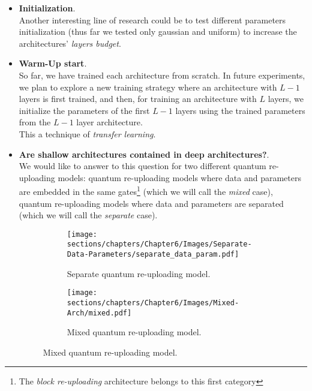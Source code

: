 \begin{itemize}
    \item \textbf{Initialization}.\\
    Another interesting line of research could be to test different parameters initialization (thus far
    we tested only gaussian and uniform) to increase the architectures' \textit{layers budget}.
    
    \item \textbf{Warm-Up start}.\\
    So far, we have trained each architecture from scratch. In future experiments, we plan to explore 
    a new training strategy where an architecture with $L-1$ layers is first trained, and then, 
    for training an architecture with $L$ layers, we initialize the parameters of the first $L-1$ 
    layers using the trained parameters from the $L-1$ layer architecture.\\
    This a technique of \textit{transfer learning}.


    \item \textbf{Are shallow architectures contained in deep architectures?}.\\
    We would like to answer to this question for two different quantum re-uploading models:
    quantum re-uploading models where data and parameters are embedded in the same gates\footnote[1]{The 
    \textit{block re-uploading} architecture belongs to this first category} (which we will call the \textit{mixed}
    case), quantum re-uploading models where data and parameters are separated (which we will call the 
    \textit{separate} case).\\

    \begin{figure}[h]
        \centering
        \begin{subfigure}[b]{0.45\textwidth}
            \centering
            \texttt{[image: sections/chapters/Chapter6/Images/Separate-Data-Parameters/separate\_data\_param.pdf]}
            \caption*{Separate quantum re-uploading model.}
        \end{subfigure}
        \begin{subfigure}[b]{0.45\textwidth}
            \centering
            \texttt{[image: sections/chapters/Chapter6/Images/Mixed-Arch/mixed.pdf]}
            \caption*{Mixed quantum re-uploading model.}
        \end{subfigure}
    \end{figure}


\end{itemize}
